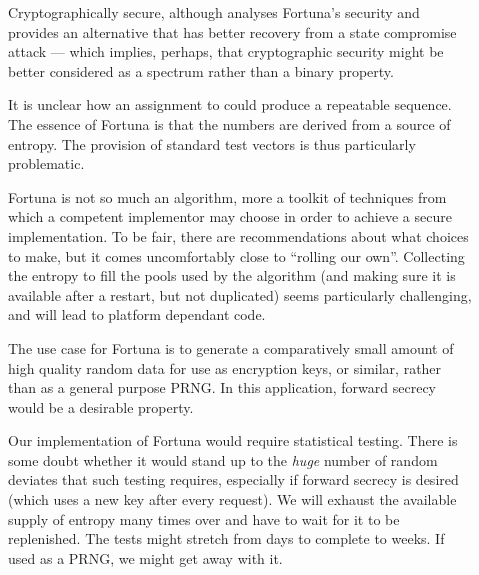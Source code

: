 \documentclass[letterpaper,12pt]{article}
\begin{document}
\begin{description}
\item[\GoodThing]
  Cryptographically secure, although \cite{DodisEtAl:Entropy} analyses
  Fortuna's security and provides an alternative that has better recovery
  from a state compromise attack --- which implies, perhaps, that
  cryptographic security might be better considered as a spectrum rather
  than a binary property.
\item[\BadThing]
  It is unclear how an assignment to \rndkwd could produce a repeatable
  sequence. The essence of Fortuna is that the numbers are derived from a
  source of entropy. The provision of standard test vectors is thus
  particularly problematic.
  
\item[\PossiblyBadThing]
  Fortuna is not so much an algorithm, more a toolkit of techniques from
  which a competent implementor may choose in order to achieve a secure
  implementation. To be fair, there are recommendations about what choices
  to make, but it comes uncomfortably close to ``rolling our own''.
  Collecting the entropy to fill the pools used by the algorithm (and
  making sure it is available after a restart, but not duplicated) seems
  particularly challenging, and will lead to platform dependant code.

\item[\PossiblyBadThing]
  The use case for Fortuna is to generate a comparatively small amount of
  high quality random data for use as encryption keys, or similar, rather
  than as a general purpose PRNG. In this application, forward secrecy
  would be a desirable property.

\item[\PossiblyBadThing]
  Our implementation of Fortuna would require statistical testing. There is
  some doubt whether it would stand up to the {\em huge} number of random
  deviates that such testing requires, especially if forward secrecy is
  desired (which uses a new key after every request). We will exhaust the
  available supply of entropy many times over and have to wait for it to be
  replenished. The tests might stretch from days to complete to weeks. If
  used as a PRNG, we might get away with it.
\end{description}


\end{document}
